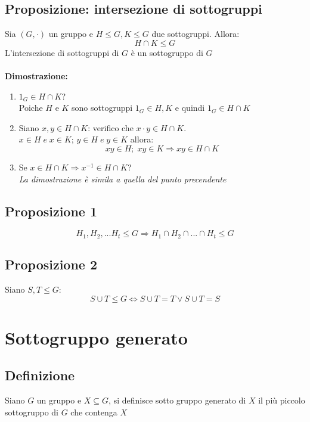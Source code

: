 \subsection{Proposizione: intersezione di sottogruppi}
Sia \((G,\cdot)\) un gruppo e \(H\leq G, K\leq G\) due sottogruppi. Allora:
\[H\cap K\leq G\]
L'intersezione di sottogruppi di \(G\) è un sottogruppo di \(G\)
\\
\\\textbf{Dimostrazione:}
\\
\begin{enumerate}
	\item \(1_G\in H\cap K\)?
	\\Poiche \(H\) e \(K\) sono sottogruppi \(1_G\in H,K\) e quindi \(1_G\in H\cap K\)

	\item Siano \(x, y\in H\cap K\): verifico che \(x\cdot y\in H\cap K\).
	\\\(x\in H\;e\;x\in K\); \(y\in H\;e\;y\in K\) allora:
	\[xy\in H;\;xy\in K\Rightarrow xy\in H\cap K\]

	\item Se \(x\in H\cap K\Rightarrow x^{-1}\in H\cap K\)?
	\\\textit{La dimostrazione è simila a quella del punto precendente}

\end{enumerate}

\subsection{Proposizione 1}
\[H_1, H_2,...H_t\leq G\Rightarrow H_1\cap H_2\cap ...\cap H_t\leq G\]

\subsection{Proposizione 2}
Siano \(S, T\leq G\):
\[S\cup T\leq G \Leftrightarrow S\cup T = T \lor S\cup T= S\]

\section{Sottogruppo generato}

\subsection{Definizione}
Siano \(G\) un gruppo e \(X\subseteq G\), si definisce sotto gruppo generato di \(X\) il più piccolo sottogruppo di \(G\) che contenga \(X\)

